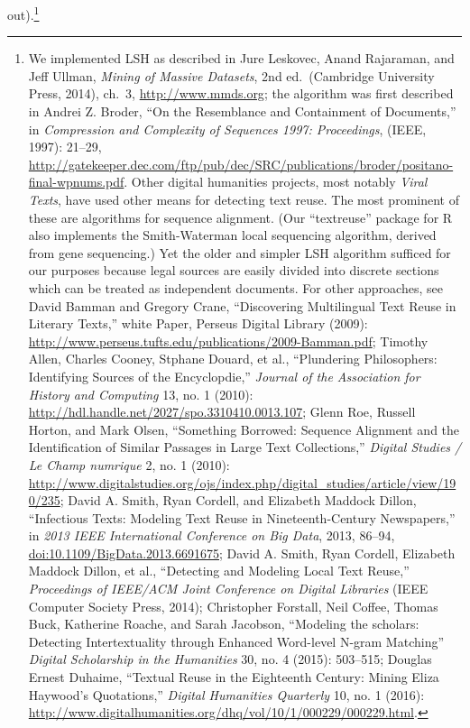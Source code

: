 \documentclass[12pt,]{article}
\let\rmarkdownfootnote\footnote%
\def\footnote{\protect\rmarkdownfootnote}
\begin{document}
out).\footnote{We implemented LSH as described in Jure Leskovec, Anand
  Rajaraman, and Jeff Ullman, \emph{Mining of Massive Datasets}, 2nd
  ed.~(Cambridge University Press, 2014), ch.~3,
  \url{http://www.mmds.org}; the algorithm was first described in Andrei
  Z. Broder, ``On the Resemblance and Containment of Documents,'' in
  \emph{Compression and Complexity of Sequences 1997: Proceedings},
  (IEEE, 1997): 21--29,
  \url{http://gatekeeper.dec.com/ftp/pub/dec/SRC/publications/broder/positano-final-wpnums.pdf}.
  Other digital humanities projects, most notably \emph{Viral Texts},
  have used other means for detecting text reuse. The most prominent of
  these are algorithms for sequence alignment. (Our ``textreuse''
  package for R also implements the Smith-Waterman local sequencing
  algorithm, derived from gene sequencing.) Yet the older and simpler
  LSH algorithm sufficed for our purposes because legal sources are
  easily divided into discrete sections which can be treated as
  independent documents. For other approaches, see David Bamman and
  Gregory Crane, ``Discovering Multilingual Text Reuse in Literary
  Texts,'' white Paper, Perseus Digital Library (2009):
  \url{http://www.perseus.tufts.edu/publications/2009-Bamman.pdf};
  Timothy Allen, Charles Cooney, Stphane Douard, et al., ``Plundering
  Philosophers: Identifying Sources of the Encyclopdie,'' \emph{Journal
  of the Association for History and Computing} 13, no. 1 (2010):
  \url{http://hdl.handle.net/2027/spo.3310410.0013.107}; Glenn Roe,
  Russell Horton, and Mark Olsen, ``Something Borrowed: Sequence
  Alignment and the Identification of Similar Passages in Large Text
  Collections,'' \emph{Digital Studies / Le Champ numrique} 2, no. 1
  (2010):
  \url{http://www.digitalstudies.org/ojs/index.php/digital_studies/article/view/190/235};
  David A. Smith, Ryan Cordell, and Elizabeth Maddock Dillon,
  ``Infectious Texts: Modeling Text Reuse in Nineteenth-Century
  Newspapers,'' in \emph{2013 IEEE International Conference on Big
  Data}, 2013, 86--94, \url{doi:10.1109/BigData.2013.6691675}; David A.
  Smith, Ryan Cordell, Elizabeth Maddock Dillon, et al., ``Detecting and
  Modeling Local Text Reuse,'' \emph{Proceedings of IEEE/ACM Joint
  Conference on Digital Libraries} (IEEE Computer Society Press, 2014);
  Christopher Forstall, Neil Coffee, Thomas Buck, Katherine Roache, and
  Sarah Jacobson, ``Modeling the scholars: Detecting Intertextuality
  through Enhanced Word-level N-gram Matching'' \emph{Digital
  Scholarship in the Humanities} 30, no. 4 (2015): 503--515; Douglas
  Ernest Duhaime, ``Textual Reuse in the Eighteenth Century: Mining
  Eliza Haywood's Quotations,'' \emph{Digital Humanities Quarterly} 10,
  no. 1 (2016):
  \url{http://www.digitalhumanities.org/dhq/vol/10/1/000229/000229.html}.}
\end{document}
